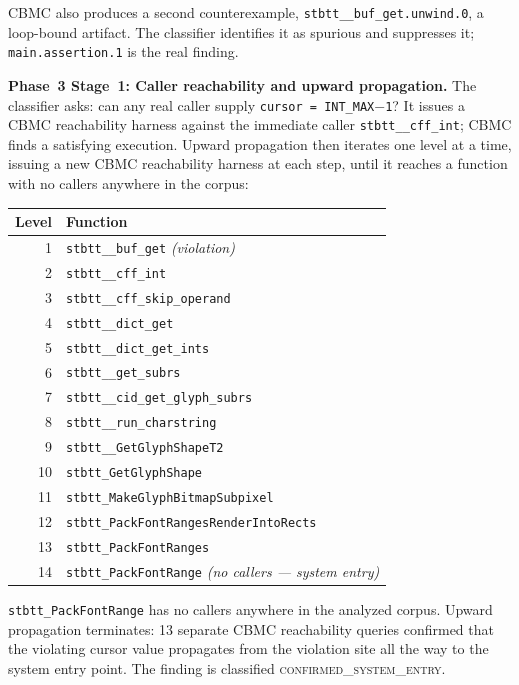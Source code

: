 \documentclass[11pt,a4paper]{article}
\newcommand{\sysconf}{\textsc{confirmed\_system\_entry}\xspace}
\begin{document}
CBMC also produces a second counterexample, \texttt{stbtt\_\_buf\_get.unwind.0},
a loop-bound artifact.  The classifier identifies it as spurious and suppresses
it; \texttt{main.assertion.1} is the real finding.

\smallskip\noindent\textbf{Phase~3 Stage~1: Caller reachability and upward
propagation.}
The classifier asks: can any real caller supply \texttt{cursor = INT\_MAX$-$1}?
It issues a CBMC reachability harness against the immediate caller
\texttt{stbtt\_\_cff\_int}; CBMC finds a satisfying execution.
Upward propagation then iterates one level at a time, issuing a new CBMC
reachability harness at each step, until it reaches a function with no
callers anywhere in the corpus:

\begin{center}
\small
\renewcommand{\arraystretch}{1.05}
\begin{tabular}{rl}
\toprule
Level & Function \\
\midrule
1  & \texttt{stbtt\_\_buf\_get} \quad\emph{(violation)} \\
2  & \texttt{stbtt\_\_cff\_int} \\
3  & \texttt{stbtt\_\_cff\_skip\_operand} \\
4  & \texttt{stbtt\_\_dict\_get} \\
5  & \texttt{stbtt\_\_dict\_get\_ints} \\
6  & \texttt{stbtt\_\_get\_subrs} \\
7  & \texttt{stbtt\_\_cid\_get\_glyph\_subrs} \\
8  & \texttt{stbtt\_\_run\_charstring} \\
9  & \texttt{stbtt\_\_GetGlyphShapeT2} \\
10 & \texttt{stbtt\_GetGlyphShape} \\
11 & \texttt{stbtt\_MakeGlyphBitmapSubpixel} \\
12 & \texttt{stbtt\_PackFontRangesRenderIntoRects} \\
13 & \texttt{stbtt\_PackFontRanges} \\
14 & \texttt{stbtt\_PackFontRange} \quad\emph{(no callers --- system entry)} \\
\bottomrule
\end{tabular}
\end{center}

\texttt{stbtt\_PackFontRange} has no callers anywhere in the analyzed corpus.
Upward propagation terminates: 13 separate CBMC reachability queries confirmed
that the violating cursor value propagates from the violation site all the way
to the system entry point.  The finding is classified \sysconf.
\end{document}
